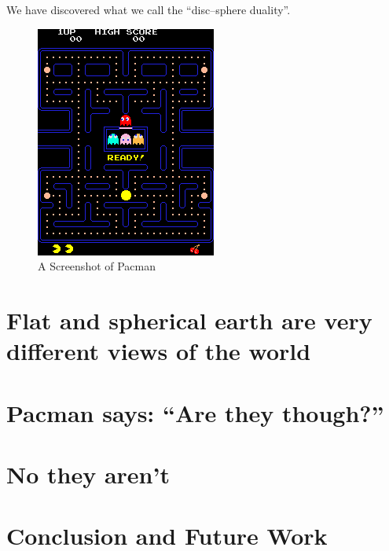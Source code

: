 \documentclass{article}
\begin{document}
We have discovered what we call the ``disc–sphere duality''.

\begin{figure}[ht]
  \centering
  \includegraphics{images/pacman.png}
  \caption{A Screenshot of Pacman}
  \label{fig:pacman-screenshot}
\end{figure}

\section{Flat and spherical earth are very different views of the world}
\section{Pacman says: ``Are they though?''}
\begin{figure}[H]
\end{figure}
\section{No they aren't}
\section{Conclusion and Future Work}
\end{document}
